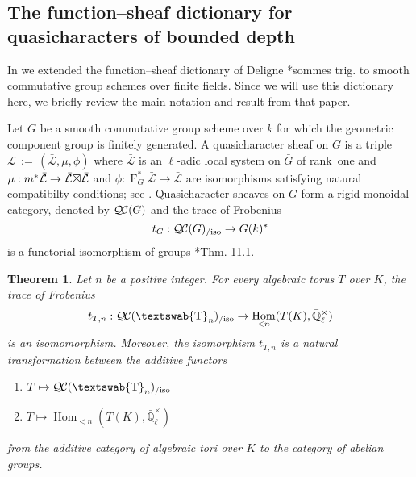 \documentclass{amsart}
\theoremstyle{plain}
\newtheorem{theorem}{Theorem}[section]
\theoremstyle{definition}
\theoremstyle{remark}
\newcommand{\EE}{\mathbb{\bar Q}_\ell}
\newcommand{\Fq}{k}
\newcommand{\EEx}{\EE^\times}
\newcommand{\mathswab}[1]{\operatorname{\textswab{#1}}}
\newcommand{\GN}[1]{\mathswab{#1}}
\newcommand{\Frob}[1]{\operatorname{F}_{#1}}
\DeclareMathOperator{\Hom}{Hom}
\newcommand{\ceq}{{\, :=\, }}
\newcommand{\qcs}[1]{{\mathcal{#1}}}
\newcommand{\gqcs}[1]{{\mathcal{\bar #1}}}
\newcommand{\QC}{{\mathcal{Q\hskip-0.8pt C}}}
\newcommand{\QCiso}[1]{\QC(#1)_{/\text{iso}}}
\newcommand{\trFrob}[1]{t_{#1}}
\newcommand{\bG}{\bar{G}}
\newcommand{\tight}[3]{\hspace{-#1pt}{#2}\hspace{-#3pt}}
\newcommand{\LxL}{\text{$\gqcs{L} \tight{0}{\boxtimes}{0} \gqcs{L}$}}
\begin{document}
\subsection{The function--sheaf dictionary for quasicharacters of bounded depth}\label{sec:qcs}

In \cite{cunningham-roe:dictionary} we extended the function--sheaf dictionary of Deligne  \cite{deligne:SGA4.5}*{sommes trig.} to smooth commutative group schemes over finite fields.
Since we will use this dictionary here, we briefly review the main notation and result from that paper.

Let $G$ be a smooth commutative group scheme over $\Fq$ for which the geometric component group is finitely generated. A quasicharacter sheaf on $G$ is a triple $\qcs{L}\ceq
(\gqcs{L},\mu,\phi)$ where $\gqcs{L}$ is an $\ell$-adic local system on $\bG$ of rank~one and $\mu: m^*
\gqcs{L} \to \LxL$ and $\phi : \Frob{G}^*\gqcs{L} \to \gqcs{L}$ are isomorphisms satisfying natural compatibilty conditions; see \cite{cunningham-roe:dictionary}.
%
Quasicharacter sheaves on $G$ form a rigid monoidal category, denoted by $\QC(G)$
and the trace of Frobenius
\begin{equation}\label{snake}
  \trFrob{G} : \QCiso{G} \to G(\Fq)^*
\end{equation}
  is a functorial isomorphism of groups \cite{cunningham-roe:dictionary}*{Thm. 11.1}.




\begin{theorem}\label{thm:application}
Let $n$ be a positive integer.
For every algebraic torus $T$ over $K$, the trace of Frobenius
  \[
\trFrob{T,n}:  \QCiso{\GN{T}_n} \to \Hom_{< n}(T(K),\EEx)
  \]
is an isomomorphism.
Moreover, the isomorphism $\trFrob{T,n}$ is a natural transformation
between the additive functors
\begin{enumerate}
\item[$F_1$:] $T \mapsto \QCiso{\GN{T}_n}$
\item[$F_2$:] $T \mapsto \Hom_{<n}(T(K),\EEx)$
\end{enumerate}
from the additive category of algebraic tori over $K$ to the category of abelian groups.
\end{theorem}
\end{document}
